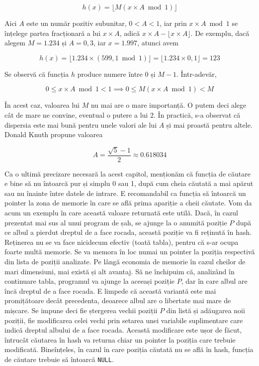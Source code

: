 \begin{equation}
  h(x) = \lfloor M(x \times A \bmod 1) \rfloor
\end{equation}

Aici $A$ este un număr pozitiv subunitar, $0 < A < 1$, iar prin $x \times A
\bmod 1$ se înțelege partea fracționară a lui $x \times A$, adică $x \times A
- \lfloor x \times A \rfloor$. De exemplu, dacă alegem $M = 1.234$ și $A =
0,3$, iar $x = 1.997$, atunci avem

\begin{equation}
  h(x) = \lfloor 1.234 \times (599,1 \bmod 1) \rfloor = \lfloor 1.234 \times 0,1 \rfloor = 123
\end{equation}

Se observă că funcția $h$ produce numere între 0 și $M-1$. Într-adevăr, 

\begin{equation}
  0 \leq x \times A \bmod 1 < 1 \implies 0 \leq M(x \times A \bmod 1) < M
\end{equation}

În acest caz, valoarea lui $M$ nu mai are o mare importanță. O putem deci
alege cât de mare ne convine, eventual o putere a lui 2. În practică, s-a
observat că dispersia este mai bună pentru unele valori ale lui $A$ și mai
proastă pentru altele. Donald Knuth propune valoarea

\begin{equation}
  A = \frac{\sqrt{5} - 1}{2} \approx 0.618034
\end{equation}

Ca o ultimă precizare necesară la acest capitol, menționăm că funcția de
căutare e bine să nu întoarcă pur și simplu 0 sau 1, după cum cheia căutată a
mai apărut sau nu înainte între datele de intrare. E recomandabil ca funcția
să întoarcă un pointer la zona de memorie în care se află prima apariție a
cheii căutate. Vom da acum un exemplu în care această valoare returnată este
utilă. Dacă, în cazul prezentat mai sus al unui program de șah, se ajunge la o
anumită poziție $P$ după ce albul a pierdut dreptul de a face rocada, această
poziție va fi reținută în hash. Reținerea nu se va face nicidecum efectiv
(toată tabla), pentru că s-ar ocupa foarte multă memorie. Se va memora în loc
numai un pointer la poziția respectivă din lista de poziții analizate. Pe
lângă economia de memorie în cazul cheilor de mari dimensiuni, mai există și
alt avantaj. Să ne închipuim că, analizând în continuare tabla, programul va
ajunge la aceeași poziție $P$, dar în care albul are încă dreptul de a face
rocada. E limpede că această variantă este mai promițătoare decât precedenta,
deoarece albul are o libertate mai mare de mișcare. Se impune deci fie
ștergerea vechii poziții $P$ din listă și adăugarea noii poziții, fie
modificarea celei vechi prin setarea unei variabile suplimentare care indică
dreptul albului de a face rocada. Această modificare este ușor de făcut,
întrucât căutarea în hash va returna chiar un pointer la poziția care trebuie
modificată. Bineînțeles, în cazul în care poziția căutată nu se află în hash,
funcția de căutare trebuie să întoarcă {\tt NULL}.

